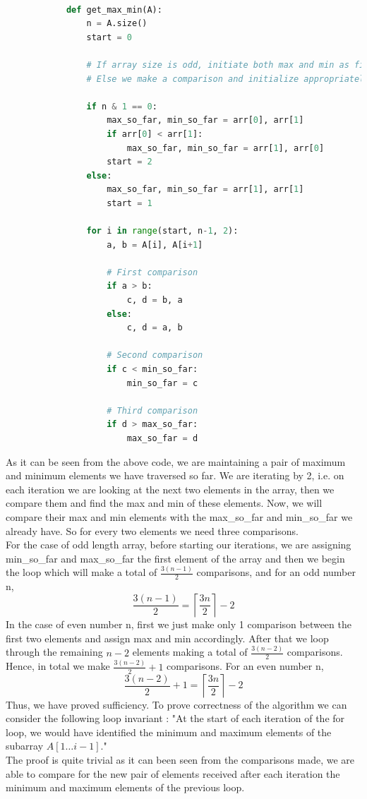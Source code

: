 \documentclass[14pt]{article}
\begin{document}
		\begin{lstlisting}[language=Python]
			
			def get_max_min(A):
				n = A.size()
				start = 0
				
				# If array size is odd, initiate both max and min as first element
				# Else we make a comparison and initialize appropriately
				
				if n & 1 == 0:
					max_so_far, min_so_far = arr[0], arr[1]
					if arr[0] < arr[1]:
						max_so_far, min_so_far = arr[1], arr[0]
					start = 2
				else:
					max_so_far, min_so_far = arr[1], arr[1]
					start = 1
				
				for i in range(start, n-1, 2):
					a, b = A[i], A[i+1]
					
					# First comparison
					if a > b:
						c, d = b, a
					else:
						c, d = a, b
						
					# Second comparison
					if c < min_so_far:
						min_so_far = c
						
					# Third comparison
					if d > max_so_far:
						max_so_far = d
		\end{lstlisting}
		As it can be seen from the above code, we are maintaining a pair of maximum and minimum elements we have traversed so far. We are iterating by 2, i.e. on each iteration we are looking at the next two elements in the array, then we compare them and find the max and min of these elements. Now, we will compare their max and min elements with the max\_so\_far and min\_so\_far we already have. So for every two elements we need three comparisons.\\
		For the case of odd length array, before starting our iterations, we are assigning min\_so\_far and max\_so\_far the first element of the array and then we begin the loop which will make a total of $\frac{3(n-1)}{2}$ comparisons, and for an odd number n,
		$$\frac{3(n-1)}{2} = \left \lceil \frac{3n}{2} \right \rceil - 2$$
		In the case of even number n, first we just make only 1 comparison between the first two elements and assign max and min accordingly. After that we loop through the remaining $n-2$ elements making a total of $ \frac{3(n-2)}{2} $ comparisons. Hence, in total we make $\frac{3(n-2)}{2} + 1$ comparisons. For an even number n,
		$$\frac{3(n-2)}{2} + 1 = \left \lceil \frac{3n}{2} \right \rceil - 2$$
		Thus, we have proved sufficiency. To prove correctness of the algorithm we can consider the following loop invariant : 
		"At the start of each iteration of the for loop, we would have identified the minimum and maximum elements of the subarray $A[1\dots{i-1}]$."\\
		 The proof is quite trivial as it can been seen from the comparisons made, we are able to compare for the new pair of elements received after each iteration the minimum and maximum elements of the previous loop.
		 \newpage
		
\end{document}
